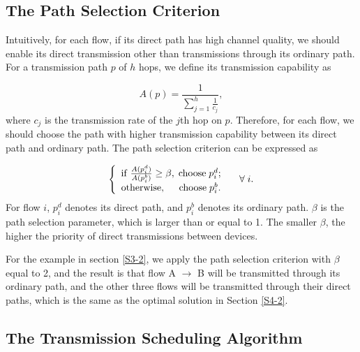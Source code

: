 \documentclass[journal]{IEEEtran}
\begin{document}
\subsection{The Path Selection Criterion}\label{S5-1}


Intuitively, for each flow, if its direct path has high channel quality, we should enable its
direct transmission other than transmissions through its ordinary path. For a transmission path $p$
of $h$ hops, we define its transmission capability as

\begin{equation}
A(p) = \frac{1}{{\sum\limits_{j = 1}^h {\frac{1}{{{c_j}}}} }},
\end{equation}
where $c_j$ is the transmission rate of the $j$th hop on $p$. Therefore, for each flow, we should
choose the path with higher transmission capability between its direct path and ordinary path. The
path selection criterion can be expressed as

\begin{equation}
\left\{ {\begin{array}{*{20}{c}}
{{\rm{if}}\;\frac{{A(p_i^d)}}{{A(p_i^b)}} \ge \beta ,\;{\rm{choose}}\;p_i^d;}\\
{{\rm{otherwise}},\;\;\;\;\;{\rm{choose}}\;p_i^b.}
\end{array}} \right.\;\;\;\;\forall \;i.
\end{equation}
For flow $i$, ${p_i^d}$ denotes its direct path, and ${p_i^b}$ denotes its ordinary path. $\beta$
is the path selection parameter, which is larger than or equal to 1. The smaller $\beta$, the
higher the priority of direct transmissions between devices.



For the example in section \ref{S3-2}, we apply the path selection criterion with $\beta$ equal to
2, and the result is that flow A $\to$ B will be transmitted through its ordinary path, and the
other three flows will be transmitted through their direct paths, which is the same as the optimal
solution in Section \ref{S4-2}.















\subsection{The Transmission Scheduling Algorithm}\label{S5-2}
\end{document}
